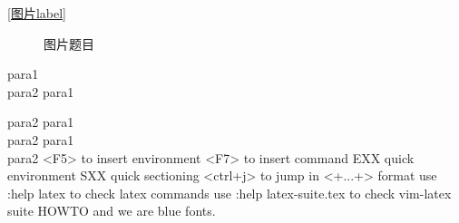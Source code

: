 	\centerline{}
	\cite{文献label}
	\ref{图片label}
	
	\begin{figure}[h]
	\caption{图片题目}
	\label{fig1}
	\end{figure}
	para1\\
	para2
	para1

	para2
	para1\\

	\noindent para2
	para1\\

	para2
	\newcommand{\新命令名称}[参数个数]{...#1（参数1）...#2...}
	<F5> to insert environment
	<F7> to insert command
	EXX quick environment
	SXX quick sectioning
	<ctrl+j> to jump in <+...+> format
	use :help latex to check latex commands
	use :help latex-suite.tex to check vim-latex suite HOWTO
	\times and \cdot
	\color{blue} we are blue fonts.
	\begin{tabular*}{0.95\textwidth}{rcc}
		\hline
	\end{tabular*}
